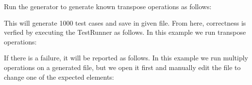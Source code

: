 Run the generator to generate known transpose operations as follows\+: 
\begin{DoxyCode}{0}
\end{DoxyCode}
 This will generate 1000 test cases and save in given file. From here, correctness is verfied by executing the Test\+Runner as follows. In this example we run transpose operations\+: 
\begin{DoxyCode}{0}
\end{DoxyCode}
 If there is a failure, it will be reported as follows. In this example we run multiply operations on a generated file, but we open it first and manually edit the file to change one of the expected elements\+: 
